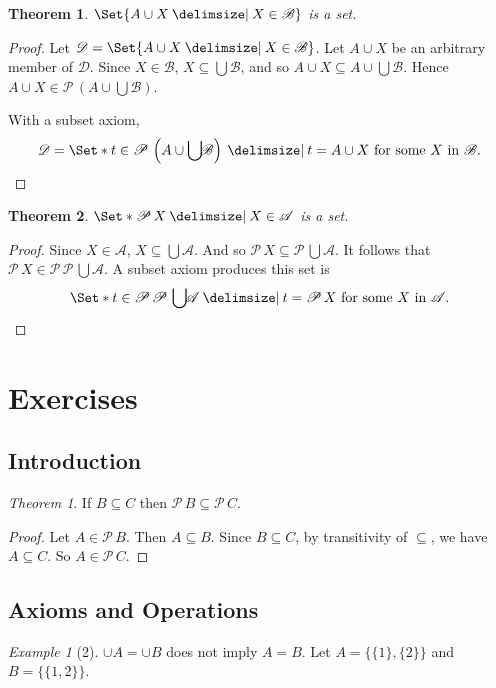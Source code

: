 \documentclass[12pt]{article}
\theoremstyle{plain}
\newtheorem{thm}{Theorem}[section]
\theoremstyle{remark}
\newtheorem*{exthm}{Theorem}
\newtheorem*{eg}{Example}
\theoremstyle{definition}
\theoremstyle{remark}
\newcommand{\powerset}{\mathscr{P}\,}
\providecommand\st{}
\newcommand\SetSymbol[1][]{%
 \nonscript\:#1\vert%
 \allowbreak%
 \nonscript\:
\mathopen{}}
\renewcommand\st{\SetSymbol[\delimsize]}
\let\oldbigcup\bigcup
\renewcommand{\bigcup}{\oldbigcup\!}
\begin{document}
\begin{thm}
 $\Set{A \cup X \st X \in \mathscr{B}}$ is a set.
\end{thm}
\begin{proof}
 Let $\mathscr{D} = \Set{A \cup X \st X \in \mathscr{B}}$. Let $A \cup X$ be an arbitrary member of $\mathscr{D}$. Since $X \in \mathscr{B}$, $X \subseteq \bigcup \mathscr{B}$, and so $A \cup X \subseteq A \cup \bigcup \mathscr{B}$. Hence $A \cup X \in \powerset\left(A \cup \bigcup  \mathscr{B}\right)$.

 With a subset axiom,
 \[
  \mathscr{D} = \Set*{t \in \powerset\left(A \cup \bigcup  \mathscr{B}\right) \st t = A \cup X \ \text{for some $X$ in $\mathscr{B}$}}.
 \]
\end{proof}

\begin{thm}
 $\Set*{\powerset X \st X \in \mathscr{A}}$ is a set.
\end{thm}
\begin{proof}
 Since $X \in \mathscr{A}$, $X \subseteq \bigcup  \mathscr{A}$. And so $\powerset X \subseteq \powerset \bigcup  \mathscr{A}$. It follows that $\powerset X \in \powerset \powerset \bigcup  \mathscr{A}$. A subset axiom produces this set is
 \[
  \Set*{t \in \powerset \powerset \bigcup  \mathscr{A} \st t = \powerset X\ \text{for some $X$ in $\mathscr{A}$}}.
 \]
\end{proof}

\section{Exercises}
\subsection{Introduction}

\begin{exthm}
 If $B \subseteq C$ then $\powerset B \subseteq \powerset C$.
\end{exthm}
\begin{proof}
 Let $A \in \powerset B$. Then $A \subseteq B$. Since $B \subseteq C$, by transitivity of $\subseteq$, we have $A \subseteq C$. So $A \in \powerset C$.
\end{proof}


\subsection{Axioms and Operations}

\begin{eg}[2]
 $\cup A = \cup B$ does not imply $A = B$.
 Let $A = \{\{1\}, \{2\}\}$ and $B = \{\{1, 2\}\}$.
\end{eg}
\end{document}
